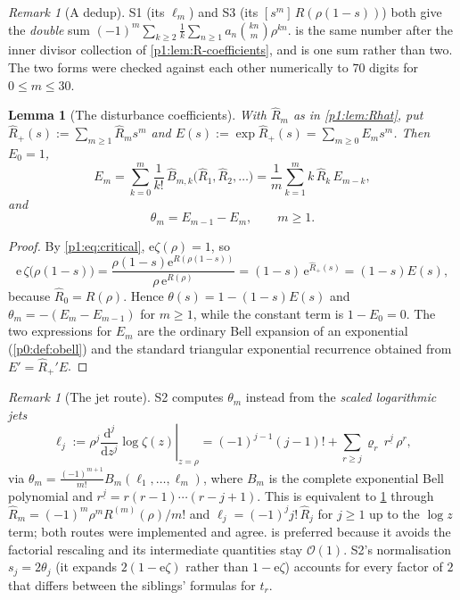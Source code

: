 \documentclass[11pt,a4paper,oneside]{book}
\theoremstyle{plain}
\newtheorem{lemma}[theorem]{Lemma}
\theoremstyle{definition}
\theoremstyle{remark}
\newtheorem{remark}[theorem]{Remark}
\newcommand{\e}{\mathrm{e}}
\newcommand{\dd}{\mathrm{d}}
\newcommand{\Coef}[1]{[#1]\,}
\newcommand{\bigO}{\mathcal{O}}
\newcommand{\OB}{\widehat{B}}
\newcommand{\EB}{B}
\begin{document}
\begin{remark}[A dedup]
\label{p1:rem:single-sum}
\textsf{S1} (its $\ell_m$) and \textsf{S3} (its $\Coef{s^m}R(\rho(1-s))$) both give the
\emph{double} sum $(-1)^m\sum_{k\ge2}\frac1k\sum_{n\ge1}a_n\binom{kn}{m}\rho^{kn}$.
 is the same number after the inner divisor collection of
\cref{p1:lem:R-coefficients}, and is one sum rather than two.  The two forms were checked
against each other numerically to $70$ digits for $0\le m\le30$.
\end{remark}

\begin{lemma}[The disturbance coefficients]
\label{p1:lem:theta}
With $\widehat R_m$ as in \cref{p1:lem:Rhat}, put $\widehat R_{+}(s):=\sum_{m\ge1}\widehat
R_ms^{m}$ and $E(s):=\exp\widehat R_{+}(s)=\sum_{m\ge0}E_ms^{m}$.  Then $E_0=1$,
\begin{equation}
 E_m=\sum_{k=0}^{m}\frac1{k!}\,\OB_{m,k}
 \bigl(\widehat R_1,\widehat R_2,\ldots\bigr)
 =\frac1m\sum_{k=1}^{m}k\,\widehat R_k\,E_{m-k},
 \label{p1:eq:E-bell}
\end{equation}
and
\begin{equation}
 \boxed{\;\theta_m=E_{m-1}-E_m,\qquad m\ge1.\;}
 \label{p1:eq:theta-bell}
\end{equation}
\end{lemma}

\begin{proof}
By \cref{p1:eq:critical}, $\e\zeta(\rho)=1$, so
\[
\e\,\zeta\bigl(\rho(1-s)\bigr) =\frac{\rho(1-s)\e^{R(\rho(1-s))}}{\rho\,\e^{R(\rho)}}
=(1-s)\,\e^{\widehat R_{+}(s)}=(1-s)E(s),
\]
because $\widehat R_0=R(\rho)$.  Hence $\theta(s)=1-(1-s)E(s)$ and $\theta_m=-(E_m-E_{m-1})$
for $m\ge1$, while the constant term is $1-E_0=0$. The two expressions for $E_m$ are the
ordinary Bell expansion of an exponential (\cref{p0:def:obell}) and the standard triangular
exponential recurrence obtained from $E'=\widehat R_{+}'E$.
\end{proof}

\begin{remark}[The jet route]
\label{p1:rem:jets}
\textsf{S2} computes $\theta_m$ instead from the \emph{scaled logarithmic jets}
\begin{equation}
 \ell_j:=\rho^{j}\left.\frac{\dd^{j}}{\dd z^{j}}\log\zeta(z)\right|_{z=\rho}
 =(-1)^{j-1}(j-1)!+\sum_{r\ge j}\varrho_r\,r^{\underline{j}}\,\rho^{r},
 \label{p1:eq:jets}
\end{equation}
via $\theta_m=\frac{(-1)^{m+1}}{m!}\EB_m(\ell_1,\ldots,\ell_m)$, where $\EB_m$ is the complete
exponential Bell polynomial and $r^{\underline{j}}=r(r-1)\cdots(r-j+1)$.  This is equivalent
to \cref{p1:lem:theta} through $\widehat R_m=(-1)^m\rho^mR^{(m)}(\rho)/m!$ and
$\ell_j=(-1)^{j}j!\,\widehat R_j$ for $j\ge1$ up to the $\log z$ term; both routes were
implemented and agree.   is preferred because it avoids the factorial
rescaling and its intermediate quantities stay $\bigO(1)$. \textsf{S2}'s normalisation
$s_j=2\theta_j$ (it expands $2(1-\e\zeta)$ rather than $1-\e\zeta$) accounts for every factor
of $2$ that differs between the siblings' formulas for $t_r$.
\end{remark}
\end{document}
